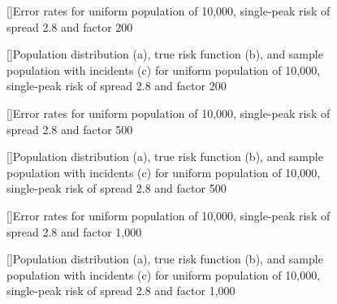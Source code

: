 {%

\begin{figure}[!htb]
    
    []{Error rates for uniform population of 10,000, single-peak risk of \gls{spread} 2.8 and \gls{factor} 200}
    \label{tab:mean_error_rates:unif_200_2.8_1h}
    
    []{Population distribution (a), true risk function (b), and sample population with incidents (c) for uniform population of 10,000, single-peak risk of \gls{spread} 2.8 and \gls{factor} 200}
    \label{fig:distributions:unif_200_2.8_1h}    
\end{figure}



\begin{figure}[!htb]
    
    []{Error rates for uniform population of 10,000, single-peak risk of \gls{spread} 2.8 and \gls{factor} 500}
    \label{tab:mean_error_rates:unif_500_2.8_1h}
    
    []{Population distribution (a), true risk function (b), and sample population with incidents (c) for uniform population of 10,000, single-peak risk of \gls{spread} 2.8 and \gls{factor} 500}
    \label{fig:distributions:unif_500_2.8_1h}    
\end{figure}



\begin{figure}[!htb]
    
    []{Error rates for uniform population of 10,000, single-peak risk of \gls{spread} 2.8 and \gls{factor} 1,000}
    \label{tab:mean_error_rates:unif_1000_2.8_1h}
    
    []{Population distribution (a), true risk function (b), and sample population with incidents (c) for uniform population of 10,000, single-peak risk of \gls{spread} 2.8 and \gls{factor} 1,000}
    \label{fig:distributions:unif_1000_2.8_1h}    
\end{figure}


}
